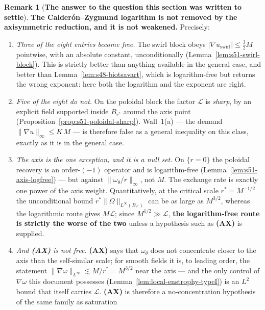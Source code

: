 \documentclass[11pt]{article}
\theoremstyle{definition}
\newtheorem{remark}[theorem]{Remark}
\theoremstyle{remark}
\begin{document}
\begin{remark}[\textbf{The answer to the question this section was written to
  settle}]\label{rem:s51-verdict-log}
  \textbf{The Calder\'on--Zygmund logarithm is not removed by the
  axisymmetric reduction, and it is not weakened.} Precisely:
  \begin{enumerate}[label=\textup{(\alph*)},leftmargin=2.4em]
  \item \emph{Three of the eight entries become free.} The swirl block obeys
    $|\nabla u_{\mathrm{swirl}}|\leq\tfrac32M$ pointwise, with an absolute
    constant, unconditionally (Lemma~\ref{lem:s51-swirl-block}). This is
    strictly better than anything available in the general case, and better
    than Lemma~\ref{lem:s48-biotsavart}, which is logarithm-free but returns
    the wrong exponent: here both the logarithm and the exponent are right.
  \item \emph{Five of the eight do not.} On the poloidal block the factor
    $\mathcal{L}$ is \emph{sharp}, by an explicit field supported inside
    $B_{r^*}$ around the axis point
    (Proposition~\ref{prop:s51-poloidal-sharp}). Wall~1(a) --- the demand
    $\|\nabla u\|_\infty\leq K\,M$ --- is therefore false as a general
    inequality on this class, exactly as it is in the general case.
  \item \emph{The axis is the one exception, and it is a null set.}
    On $\{r=0\}$ the poloidal recovery is an order-$(-1)$ operator and is
    logarithm-free (Lemma~\ref{lem:s51-axis-logfree}) --- but against
    $\|\omega_\theta/r\|_\infty$, not $M$. The exchange rate is exactly one
    power of the axis weight. Quantitatively, at the critical scale
    $r^*=M^{-1/2}$ the unconditional bound
    $r^*\|\Omega\|_{L^\infty(B_{r^*})}$ can be as large as $M^{3/2}$, whereas
    the logarithmic route gives $M\mathcal{L}$; since
    $M^{1/2}\gg\mathcal{L}$, \textbf{the logarithm-free route is strictly the
    worse of the two} unless a hypothesis such as \textbf{(AX)} is supplied.
  \item \emph{And \textbf{(AX)} is not free.} \textbf{(AX)} says that
    $\omega_\theta$ does not concentrate closer to the axis than the
    self-similar scale; for smooth fields it is, to leading order, the
    statement $\|\nabla\omega\|_{L^\infty}\lesssim M/r^*=M^{3/2}$ near the
    axis --- and the only control of $\nabla\omega$ this document possesses
    (Lemma~\ref{lem:local-enstrophy-typeI}) is an $L^2$ bound that itself
    carries $\mathcal{L}$. \textbf{(AX)} is therefore a no-concentration
    hypothesis of the same family as saturation

\end{enumerate}
\end{remark}
\end{document}
